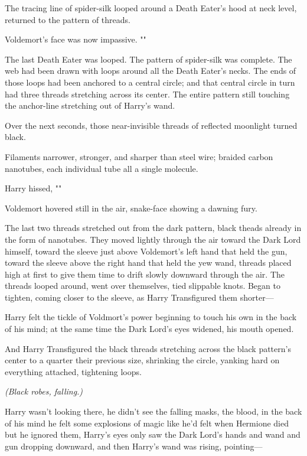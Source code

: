 The tracing line of spider-silk looped around a Death Eater's hood at neck
level, returned to the pattern of threads.

Voldemort's face was now impassive. ""

The last Death Eater was looped. The pattern of spider-silk was complete. The
web had been drawn with loops around all the Death Eater's necks. The ends of
those loops had been anchored to a central circle; and that central circle in
turn had three threads stretching across its center. The entire pattern still
touching the anchor-line stretching out of Harry's wand.

Over the next seconds, those near-invisible threads of reflected moonlight
turned black.

Filaments narrower, stronger, and sharper than steel wire; braided carbon
nanotubes, each individual tube all a single molecule.

Harry hissed, ""

Voldemort hovered still in the air, snake-face showing a dawning fury.

The last two threads stretched out from the dark pattern, black theads already
in the form of nanotubes. They moved lightly through the air toward the Dark
Lord himself, toward the sleeve just above Voldemort's left hand that held the
gun, toward the sleeve above the right hand that held the yew wand, threads
placed high at first to give them time to drift slowly downward through the
air. The threads looped around, went over themselves, tied slippable knots.
Began to tighten, coming closer to the sleeve, as Harry Transfigured them
shorter---

Harry felt the tickle of Voldmort's power beginning to touch his own in the
back of his mind; at the same time the Dark Lord's eyes widened, his mouth
opened.

And Harry Transfigured the black threads stretching across the black pattern's
center to a quarter their previous size, shrinking the circle, yanking hard on
everything attached, tightening loops.

\emph{(Black robes, falling.)}

Harry wasn't looking there, he didn't see the falling masks, the blood, in the
back of his mind he felt some explosions of magic like he'd felt when Hermione
died but he ignored them, Harry's eyes only saw the Dark Lord's hands and wand
and gun dropping downward, and then Harry's wand was rising, pointing---

